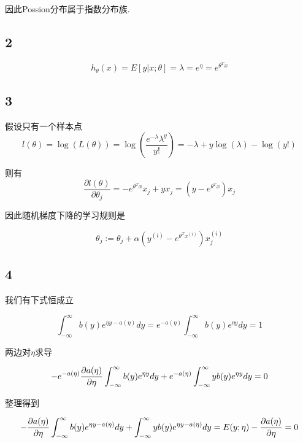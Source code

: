 \documentclass{ctexart}
\begin{document}
因此Possion分布属于指数分布族.

\subsection{2} 
\begin{equation*}
	h_\theta(x) = E[y|x;\theta] = \lambda = e^\eta = e^{\theta^T x}
\end{equation*}

\subsection{3}

假设只有一个样本点
\begin{equation}
	l(\theta) = \log(L(\theta)) = \log(\frac{e^{-\lambda}\lambda^y}{y!}) = -\lambda + y \log(\lambda) - \log(y!)
\end{equation}

则有
\begin{equation}
	\frac{\partial l(\theta)}{\partial \theta_j} = -e^{\theta^Tx}x_j + yx_j = (y - e^{\theta^Tx})x_j
\end{equation}

因此随机梯度下降的学习规则是

\begin{equation}
	\theta_j:= \theta_j + \alpha(y^{(i)} - e^{\theta^Tx^{(i)}})x_j^{(i)}
\end{equation}

\subsection{4}
我们有下式恒成立

\begin{equation}
	\int_{-\infty}^{\infty} b(y)e^{\eta y - a(\eta)}dy =e^{-a(\eta)} \int_{-\infty}^{\infty} b(y)e^{\eta y}dy =1
\end{equation}

两边对$\eta$求导

\begin{equation}
	-e^{-a(\eta)}\frac{\partial a(\eta)}{\partial \eta} \int_{-\infty}^{\infty} b(y)e^{\eta y}dy + e^{-a(\eta)} \int_{-\infty}^{\infty} yb(y)e^{\eta y}dy = 0 \notag
\end{equation}

整理得到

\begin{equation}
-\frac{\partial a(\eta)}{\partial \eta} \int_{-\infty}^{\infty} b(y)e^{\eta y - a(\eta)}dy +  \int_{-\infty}^{\infty} yb(y)e^{\eta y - a(\eta)}dy = E(y;\eta) - \frac{\partial a(\eta)}{\partial \eta} = 0 \notag
\end{equation}
\end{document}
